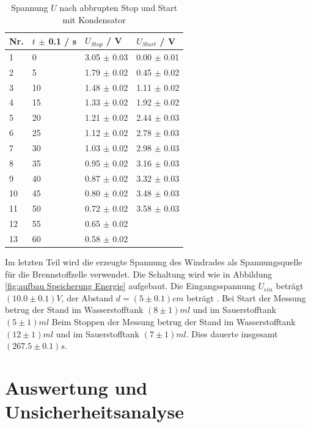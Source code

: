 \documentclass[12pt,a4paper,twoside]{article}
\begin{document}
\begin{table}[H]
    \centering
    \caption{Spannung $U$ nach abbrupten Stop und Start mit Kondensator}
    \label{tab:Messdaten Windkraft abbrupt stop kondensator}
    \begin{tabular}{| l | l | l | l |}
        \hline
        Nr. & $t$ $\pm $ 0.1 / s & $U_{Stop}$ / V & $U_{Start}$ / V \\
        \hline
        1  & 0  & 3.05 $\pm$ 0.03  & 0.00 $\pm$ 0.01  \\
        2  & 5  & 1.79 $\pm$ 0.02  & 0.45 $\pm$ 0.02  \\
        3  & 10 & 1.48 $\pm$ 0.02  & 1.11 $\pm$ 0.02  \\
        4  & 15 & 1.33 $\pm$ 0.02  & 1.92 $\pm$ 0.02  \\
        5  & 20 & 1.21 $\pm$ 0.02  & 2.44 $\pm$ 0.03  \\
        6  & 25 & 1.12 $\pm$ 0.02  & 2.78 $\pm$ 0.03  \\
        7  & 30 & 1.03 $\pm$ 0.02  & 2.98 $\pm$ 0.03  \\
        8  & 35 & 0.95 $\pm$ 0.02  & 3.16 $\pm$ 0.03  \\
        9  & 40 & 0.87 $\pm$ 0.02  & 3.32 $\pm$ 0.03  \\
        10 & 45 & 0.80 $\pm$ 0.02  & 3.48 $\pm$ 0.03  \\
        11 & 50 & 0.72 $\pm$ 0.02  & 3.58 $\pm$ 0.03  \\
        12 & 55 & 0.65 $\pm$ 0.02  &   \\
        13 & 60 & 0.58 $\pm$ 0.02  &   \\
        \hline  
    \end{tabular}
\end{table}

\noindent
Im letzten Teil wird die erzeugte Spannung des Windrades als Spannungsquelle für die Brennstoffzelle verwendet. 
Die Schaltung wird wie in Abbildung \ref{fig:aufbau Speicherung Energie} aufgebaut. 
Die Eingangsspannung $U_{ein}$ beträgt $(10.0 \pm 0.1)V$, der Abstand $d = (5 \pm 0.1)cm$ beträgt . Bei Start der Messung betrug der Stand im Wasserstofftank $(8 \pm 1)ml$ und im Sauerstofftank $(5 \pm 1)ml$
Beim Stoppen der Messung betrug der Stand im Wasserstofftank $(12 \pm 1)ml$ und im Sauerstofftank $(7 \pm 1)ml$. Dies dauerte insgesamt $(267.5 \pm 0.1) s$. 


\section{Auswertung und Unsicherheitsanalyse} %
\end{document}
